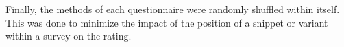 \documentclass[%
class=scrreprt,
chapterprefix=false,%
open=right,%
twoside=false,%
paper=a4,%
logofile={Logo\_zentral\_farbig\_EN.png},%
thesistype=master,%
UKenglish,%
]{se2thesis}
\newcounter{urlfootnote}
\newcommand{\onecurl}[2]{%
	\stepcounter{urlfootnote}%
	\expandafter\def\csname urlfootnote:#1\endcsname{\theurlfootnote}%
	\footnote{\label{url:#1}\url{#1}, accessed: #2}%
}
\newcommand{\curl}[2]{%
	\ifcsdef{urlfootnote:#1}{%
		\textsuperscript{\ref{url:#1}}%
	}{%
		\onecurl{#1}{#2}%
	}%
}
\theoremstyle{definition}
\begin{document}
	Finally, the methods of each questionnaire were randomly shuffled within itself. This was done to minimize the impact of the position of a snippet or variant within a survey on the rating.

	
%	
%	
%	
\end{document}
